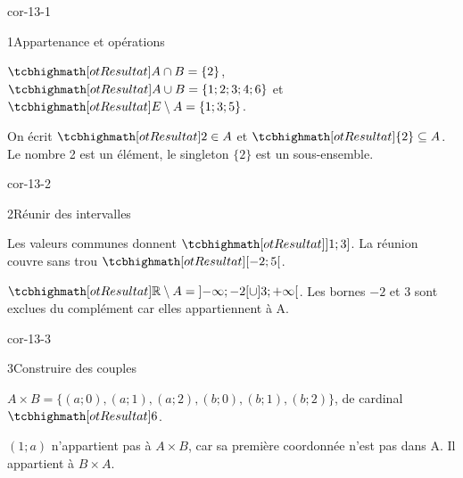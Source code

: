 \corrigesSouples

\begin{blocLivre}{cor-13-1}
\begin{corrige}{1}{Appartenance et opérations}
\begin{questions}
\item $\res{A\cap B=\{2\}}$, $\res{A\cup B=\{1;2;3;4;6\}}$ et $\res{E\setminus A=\{1;3;5\}}$.
\item On écrit $\res{2\in A}$ et $\res{\{2\}\subseteq A}$. Le nombre 2 est un élément, le singleton $\{2\}$ est un sous-ensemble.
\end{questions}
\label{figlivre-r13-01-venn-cor}

\end{corrige}
\end{blocLivre}
\begin{blocLivre}{cor-13-2}
\begin{corrige}{2}{Réunir des intervalles}
\begin{questions}
\item Les valeurs communes donnent $\res{]1;3]}$. La réunion couvre sans trou $\res{[-2;5[}$.
\item $\res{\R\setminus A=\mathopen{]}-\infty;-2[\cup]3;+\infty[}$. Les bornes $-2$ et 3 sont exclues du complément car elles appartiennent à A.
\end{questions}
\label{figlivre-r13-02-intervalles-cor}

\end{corrige}
\end{blocLivre}
\begin{blocLivre}{cor-13-3}
\begin{corrige}{3}{Construire des couples}
\begin{questions}
\item $A\times B=\{(a;0),(a;1),(a;2),(b;0),(b;1),(b;2)\}$, de cardinal $\res{6}$.
\item $(1;a)$ n’appartient pas à $A\times B$, car sa première coordonnée n’est pas dans A. Il appartient à $B\times A$.
\end{questions}
\label{figlivre-r13-03-couples-cor}

\end{corrige}
\end{blocLivre}
